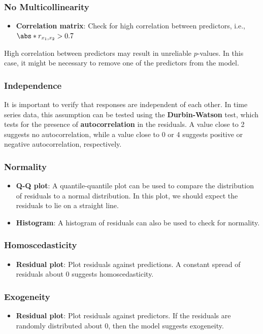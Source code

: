 \documentclass{article}
\begin{document}
\subsubsection{No Multicollinearity}
\begin{itemize}
    \item \textbf{Correlation matrix}: Check for high correlation
          between predictors, i.e., \(\abs*{r_{x_1,x_2}} > 0.7\)
\end{itemize}
High correlation between predictors may result in unreliable
\(p\)-values. In this case, it might be necessary to remove one of the
predictors from the model.
\subsubsection{Independence}
It is important to verify that responses are independent of each other.
In time series data, this assumption can be tested using the
\textbf{Durbin-Watson} test, which tests for the presence of
\textbf{autocorrelation} in the residuals. A value close to 2 suggests
no autocorrelation, while a value close to 0 or 4 suggests positive or
negative autocorrelation, respectively.
\subsubsection{Normality}
\begin{itemize}
    \item \textbf{Q-Q plot}: A quantile-quantile plot can be used to
          compare the distribution of residuals to a normal distribution.
          In this plot, we should expect the residuals to lie on a straight
          line.
    \item \textbf{Histogram}: A histogram of residuals can also be used
          to check for normality.
\end{itemize}
\subsubsection{Homoscedasticity}
\begin{itemize}
    \item \textbf{Residual plot}: Plot residuals against predictions.
          A constant spread of residuals about 0 suggests homoscedasticity.
\end{itemize}
\subsubsection{Exogeneity}
\begin{itemize}
    \item \textbf{Residual plot}: Plot residuals against predictors. If
          the residuals are randomly distributed about 0, then the model
          suggests exogeneity.
\end{itemize}
\end{document}
